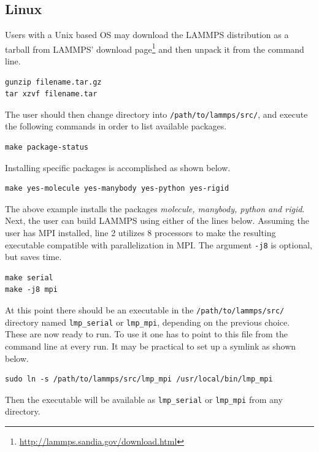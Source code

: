 \documentclass[twoside,english]{uiofysmaster}
\begin{document}
\subsection{Linux}
Users with a Unix based OS may download the LAMMPS distribution as a tarball from LAMMPS' download page\footnote{\href{http://lammps.sandia.gov/download.html}{http://lammps.sandia.gov/download.html}} and then unpack it from the command line.
\begin{lstlisting}
gunzip filename.tar.gz
tar xzvf filename.tar
\end{lstlisting}
The user should then change directory into \texttt{/path/to/lammps/src/}, and execute the following commands in order to list available packages. 
\begin{lstlisting}
make package-status
\end{lstlisting}
Installing specific packages is accomplished as shown below.
\begin{lstlisting}
make yes-molecule yes-manybody yes-python yes-rigid 
\end{lstlisting}
The above example installs the packages \textit{molecule, manybody, python and rigid}.
Next, the user can build LAMMPS using either of the lines below. 
Assuming the user has MPI installed, line 2 utilizes 8 processors to make the resulting executable compatible with parallelization in MPI. The argument \texttt{-j8} is optional, but saves time.
\begin{lstlisting}
make serial
make -j8 mpi
\end{lstlisting}
At this point there should be an executable in the \texttt{/path/to/lammps/src/} directory named \texttt{lmp\_serial} or \texttt{lmp\_mpi}, depending on the previous choice. These are now ready to run.
To use it one has to point to this file from the command line at every run. It may be practical to set up a symlink as shown below.
\begin{lstlisting}
sudo ln -s /path/to/lammps/src/lmp_mpi /usr/local/bin/lmp_mpi
\end{lstlisting}
Then the executable will be available as \texttt{lmp\_serial} or \texttt{lmp\_mpi} from any directory. 
\end{document}
